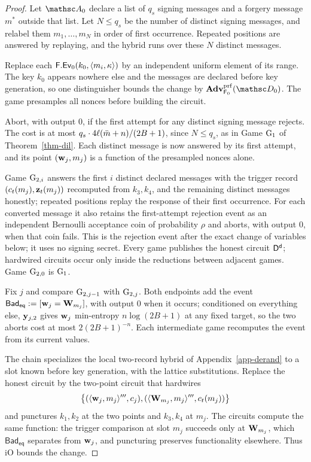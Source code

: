 \begin{proof}
Let $\advA_0$ declare a list of $q_s$ signing messages and a forgery message $m^*$ outside that list. Let $N\le q_s$ be the number of distinct signing messages, and relabel them $m_1,\ldots,m_N$ in order of first occurrence. Repeated positions are answered by replaying, and the hybrid runs over these $N$ distinct messages.

 Replace each $\mathsf{F}.\mathsf{Ev}_0(k_0, \langle m_i,\kappa \rangle)$ by an independent uniform element of its range. The key $k_0$ appears nowhere else and the messages are declared before key generation, so one distinguisher bounds the change by $\AdvPRF{\PRF_0}{\advD_0}$. The game presamples all nonces before building the circuit.

 Abort, with output 0, if the first attempt for any distinct signing message rejects. The cost is at most $q_s \cdot 4\ell(\bar m+n)/(2B+1)$, since $N\le q_s$, as in Game $\textnormal{G}_1$ of Theorem~\ref{thm-dil}. Each distinct message is now answered by its first attempt, and its point $(\mathbf{w}_j, m_j)$ is a function of the presampled nonces alone.

 Game $\textnormal{G}_{2,i}$ answers the first $i$ distinct declared messages with the trigger record $(c_t(m_j), \mathbf{z}_t(m_j))$ recomputed from $k_3, k_4$, and the remaining distinct messages honestly; repeated positions replay the response of their first occurrence. For each converted message it also retains the first-attempt rejection event as an independent Bernoulli acceptance coin of probability $\rho$ and aborts, with output 0, when that coin fails. This is the rejection event after the exact change of variables below; it uses no signing secret. Every game publishes the honest circuit $\mathsf{D}^{\mathsf{d}}$; hardwired circuits occur only inside the reductions between adjacent games. Game $\textnormal{G}_{2,0}$ is $\textnormal{G}_1$.

Fix $j$ and compare $\textnormal{G}_{2,j-1}$ with $\textnormal{G}_{2,j}$. Both endpoints add the event $\mathsf{Bad}_{\mathsf{eq}} := [\mathbf{w}_j = \mathbf{W}_{m_j}]$, with output 0 when it occurs; conditioned on everything else, $\mathbf{y}_{j,2}$ gives $\mathbf{w}_j$ min-entropy $n\log(2B+1)$ at any fixed target, so the two aborts cost at most $2(2B+1)^{-n}$. Each intermediate game recomputes the event from its current values.

The chain specializes the local two-record hybrid of Appendix~\ref{app-derand} to a slot known before key generation, with the lattice substitutions. Replace the honest circuit by the two-point circuit that hardwires
$$
\bigl\{(\langle \mathbf{w}_j, m_j \rangle''', c_j),
(\langle \mathbf{W}_{m_j}, m_j \rangle''', c_t(m_j))\bigr\}
$$
and punctures $k_1, k_2$ at the two points and $k_3, k_4$ at $m_j$. The circuits compute the same function: the trigger comparison at slot $m_j$ succeeds only at $\mathbf{W}_{m_j}$, which $\mathsf{Bad}_{\mathsf{eq}}$ separates from $\mathbf{w}_j$, and puncturing preserves functionality elsewhere. Thus iO bounds the change.


\end{proof}
